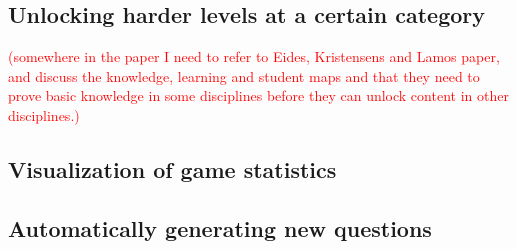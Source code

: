 \subsection{Unlocking harder levels at a certain category}
\textcolor{red}{(somewhere in the paper I need to refer to Eides, Kristensens and Lamos paper, and discuss the knowledge, learning and student maps and that they need to prove basic knowledge in some disciplines before they can unlock content in other disciplines.)}
\subsection{Visualization of game statistics}
\subsection{Automatically generating new questions}
